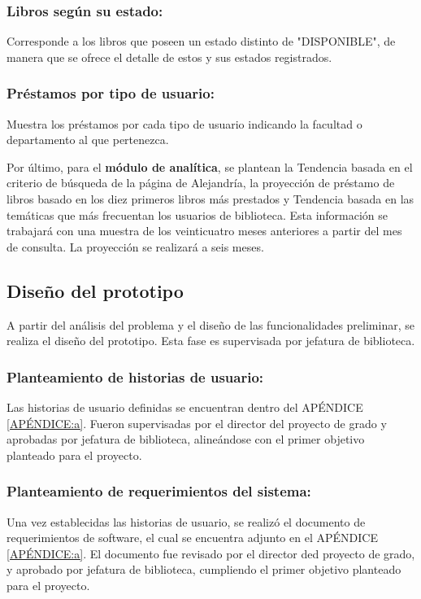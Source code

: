 \documentclass[spanish]{ieee_upb}
\begin{document}
\subsubsection{Libros según su estado: } Corresponde a los libros que poseen un estado distinto de "DISPONIBLE", de manera que se ofrece el detalle de estos y sus estados registrados.
\subsubsection{Préstamos por tipo de usuario:} Muestra los préstamos por cada tipo de usuario indicando la facultad o departamento al que pertenezca.

\vspace{0.3cm}
Por último, para el \textbf{módulo de analítica}, se plantean la Tendencia basada en el criterio de búsqueda de la página de Alejandría, la proyección de préstamo de libros basado en los diez primeros libros más prestados y Tendencia basada en las temáticas que más frecuentan los usuarios de biblioteca. Esta información se trabajará con una muestra de los veinticuatro meses anteriores a partir del mes de consulta. La proyección se realizará a seis meses.

\vspace{0.3cm}
\subsection{Diseño del prototipo}

A partir del análisis del problema y el diseño de las funcionalidades preliminar, se realiza el diseño del prototipo. Esta fase es supervisada por jefatura de biblioteca.

\subsubsection{Planteamiento de historias de usuario: }

Las historias de usuario definidas se encuentran dentro del APÉNDICE \ref{APÉNDICE:a}. Fueron supervisadas por el director del proyecto de grado y aprobadas por jefatura de biblioteca, alineándose con el primer objetivo planteado para el proyecto.

\subsubsection{Planteamiento de requerimientos del sistema: }

Una vez establecidas las historias de usuario, se realizó el documento de requerimientos de software, el cual se encuentra adjunto en el APÉNDICE \ref{APÉNDICE:a}. El documento fue revisado por el director ded proyecto de grado, y aprobado por jefatura de biblioteca, cumpliendo el primer objetivo planteado para el proyecto. 
\end{document}
